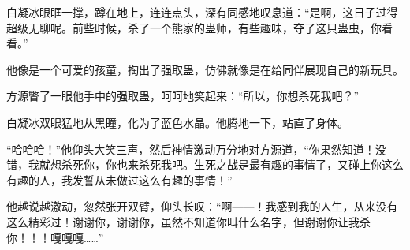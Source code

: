 \begin{this_body}
白凝冰眼眶一撑，蹲在地上，连连点头，深有同感地叹息道：“是啊，这日子过得超级无聊呢。前些时候，杀了一个熊家的蛊师，有些趣味，夺了这只蛊虫，你看看。”

他像是一个可爱的孩童，掏出了强取蛊，仿佛就像是在给同伴展现自己的新玩具。

方源瞥了一眼他手中的强取蛊，呵呵地笑起来：“所以，你想杀死我吧？”

白凝冰双眼猛地从黑瞳，化为了蓝色水晶。他腾地一下，站直了身体。

“哈哈哈！”他仰头大笑三声，然后神情激动万分地对方源道，“你果然知道！没错，我就想杀死你，你也来杀死我吧。生死之战是最有趣的事情了，又碰上你这么有趣的人，我发誓从未做过这么有趣的事情！”

他越说越激动，忽然张开双臂，仰头长叹：“啊——！我感到我的人生，从来没有这么精彩过！谢谢你，谢谢你，虽然不知道你叫什么名字，但谢谢你让我杀你！！！嘎嘎嘎……”

\end{this_body}

